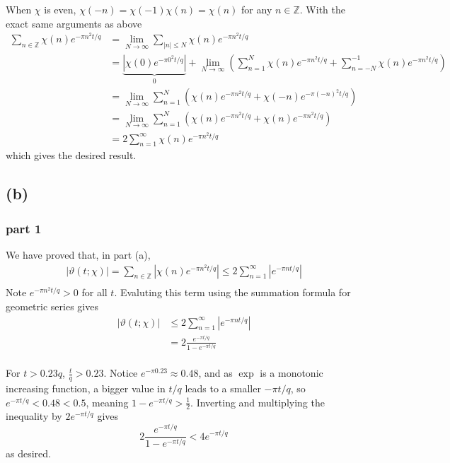 \documentclass{article}
\theoremstyle{definition}
\theoremstyle{definition}
\theoremstyle{remark}
\renewcommand{\t}{\vartheta}
\newcommand{\x}{\chi}
\newcommand{\bb}[1]{\mathbb{#1}} %
\begin{document}
When $\chi$ is even, $\chi(-n) = \chi(-1) \chi(n) = \chi(n)$ for any $n \in \bb{Z}$.
With the exact same arguments as above
\begin{align}
	\sum_{n \in \mathbb{Z}} \chi(n) e^{-\pi n^2 t/q} 
	&= \lim_{N \rightarrow  \infty}\sum_{|n| \leq N } \chi(n) e^{-\pi n^2 t/q} 
	\\
	&= \underbrace{\left|\chi(0)e^{-\pi 0^2 t/q}\right|}_{0} + \lim_{N \rightarrow  \infty} \left(
	\sum_{n = 1}^{N} \chi(n) e^{-\pi n^2 t/q} + \sum_{n = -N}^{-1} \chi(n) e^{-\pi n^2 t/q}  \right) 
	\\
	&= \lim_{N \rightarrow  \infty} \sum_{n = 1}^{N} \left(\chi(n) e^{-\pi n^2 t/q} +  \chi(-n) e^{-\pi (-n)^2 t/q}\right) 
	\\
	&= \lim_{N \rightarrow  \infty} \sum_{n = 1}^{N} \left(\chi(n) e^{-\pi n^2 t/q} +  \chi(n) e^{-\pi n^2 t/q}\right) 
	\\ 
	&= 2 \sum_{n = 1}^{\infty} \chi(n) e^{-\pi n^2 t/q} 
\end{align}
which gives the desired result.

\subsection*{(b)}
\subsubsection*{part 1}
We have proved that, in part (a),
\begin{align}
	|\t(t; \x)| = \sum_{n \in \mathbb{Z}} \left|\chi(n) e^{-\pi n^2 t/q}\right| 
	\leq 2 \sum_{n = 1}^{\infty} \left|e^{-\pi n t/q}\right| \\ 
\end{align}
Note $e^{-\pi n^2 t/q} > 0$ for all $t$. Evaluting this term using the summation formula for geometric series gives 
\begin{align}
	|\t(t; \x)| 
	&\leq 2 \sum_{n = 1}^{\infty} \left|e^{-\pi n t/q}\right| \\ 
	&= 2 \frac{e^{-\pi t/q}}{1 - e^{-\pi t/q}} \\
\end{align}

For $t > 0.23q$, $\frac{t}{q} > 0.23$. 
Notice $e^{-\pi 0.23} \approx 0.48$, and as $\exp$ is a monotonic increasing function, a bigger value in $t/q$ leads to a smaller $-\pi t / q$, so $e^{-\pi t / q} < 0.48 <  0.5$, meaning $1 - e^{-\pi t/q} > \frac{1}{2}$. 
Inverting and multiplying the inequality by $2 e^{-\pi t/q}$ gives
$$
2 \frac{e^{-\pi t/q}}{1 - e^{-\pi t/q}}  < 4 e^{-\pi t/q}
$$
as desired.
\end{document}
